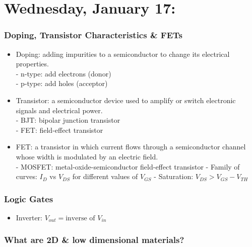 \documentclass[10pt, oneside]{article}
\begin{document}
\maketitle
\tableofcontents

\vspace{.25in}


\section{Wednesday, January 17: }

\subsubsection{Doping, Transistor Characteristics \& FETs}
\begin{itemize}
\item Doping: adding impurities to a semiconductor to change its electrical properties.\\
    - n-type: add electrons (donor)\\
    - p-type: add holes (acceptor)
\item Transistor: a semiconductor device used to amplify or switch electronic signals and electrical power.\\
    - BJT: bipolar junction transistor\\
    - FET: field-effect transistor
\item FET: a transistor in which current flows through a semiconductor channel whose width is modulated by an electric field.\\
    - MOSFET: metal-oxide-semiconductor field-effect transistor
    - Family of curves: $I_D$ vs $V_{DS}$ for different values of $V_{GS}$
    - Saturation: $V_{DS} > V_{GS} - V_{TH}$

\end{itemize}

\subsubsection{Logic Gates}
\begin{itemize}
\item Inverter: $V_{out} =  \text{inverse of } V_{in}$
\end{itemize}

\subsubsection{What are 2D \& low dimensional materials?}
\end{document}
